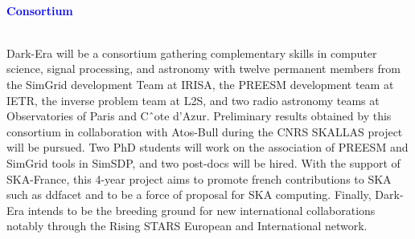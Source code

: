 \documentclass{beamer}
\renewenvironment{block}[1]{%
\begin{Sbox}%
\begin{minipage}[t]{\textwidth}
~\\
\textcolor{blue}{\quad #1}~\\
~\\%
\vspace{0.5cm}
} 
{%
\end{minipage}
\end{Sbox}\Ovalbox{\TheSbox}%
}
\begin{document}
{\begin{columns}[t]
\begin{column}{.49\linewidth}
\begin{block}{\large \textbf{Consortium}}
 \begin{minipage}{0.95\textwidth}
 Dark-Era will be a consortium gathering complementary skills in computer science, signal processing, and astronomy with twelve permanent members from the SimGrid development Team at IRISA, the PREESM development team at IETR, the inverse problem team at L2S, and two radio astronomy teams at Observatories of Paris and Cˆote d’Azur. Preliminary results obtained by this consortium in collaboration with Atos-Bull during the CNRS SKALLAS project will be pursued. Two PhD students will work on the association of PREESM and SimGrid tools in SimSDP, and two post-docs will be hired. With the support of SKA-France, this 4-year project aims to promote french contributions to SKA such as ddfacet and to be a force of proposal for SKA computing. Finally, Dark-Era intends to be the breeding ground for new international collaborations notably through the Rising STARS European and International network.
 \end{minipage}

 
\end{block}




\small{
         \begin{minipage}{.99\textwidth}
         
         \renewcommand{\bibsection}{}
  	\end{minipage}
  	}

\end{column}
\end{columns}

}
\end{document}
